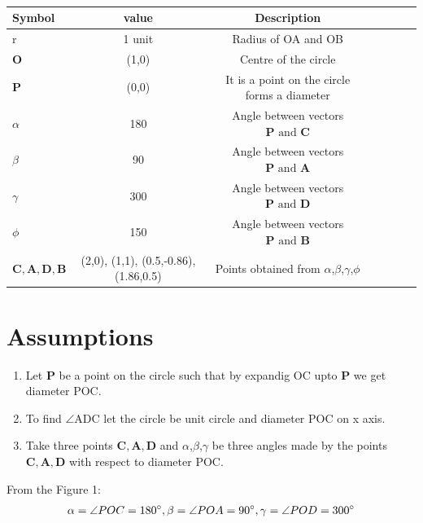 \documentclass[12pt]{article}
\let\vec\mathbf
\begin{document}
\begin{table}[htbp]
 \begin{center}
    \begin{tabular}{|l|c|c|c|c|c|c} \hline \textbf{Symbol}
  & \textbf{value} & \textbf{Description} \\
 \hline
	    r &1 unit& Radius of OA and OB\\ \hline
	    $\vec{O}$ &(1,0) & Centre of the circle\\ \hline
	    $\vec{P}$ &(0,0) & It is a point on the circle forms a diameter\\\hline
	    $\alpha$ & 180\degree&Angle between vectors $\vec{P} \text{ and } \vec{C}$ \\ \hline
	    $\beta$ & 90\degree&Angle between vectors $\vec{P} \text{ and } \vec{A}$ \\ \hline
	    $\gamma$ & 300\degree&Angle between vectors $\vec{P} \text{ and } \vec{D}$ \\ \hline
	    $\phi$ & 150\degree&Angle between vectors $\vec{P} \text{ and } \vec{B}$ \\ \hline

	    $\vec{C},\vec{A},\vec{D},\vec{B}$ &(2,0), (1,1), (0.5,-0.86), (1.86,0.5) & Points obtained from $\alpha$,$\beta$,$\gamma$,$\phi$\\ \hline
\end{tabular}   
\end{center}
\caption{\label{table:dummytable} }
\end{table}

\section*{\large Assumptions}
\begin{enumerate}
	\item Let $\vec{P}$ be a point on the circle such that by expandig OC upto $\vec{P}$ we get diameter POC.
\item To find $\angle$ADC let the circle be unit circle and diameter POC on x axis.
\item Take three points $\vec{C,A,D}$ and $\alpha$,$\beta$,$\gamma$ be three angles made by the points $\vec{C,A,D}$ with respect to diameter POC.
\end{enumerate}
From the Figure 1:
\begin{align}
\alpha = {\angle POC}= 180\degree, 
\beta= {\angle POA} = 90\degree,
\gamma = {\angle POD}=300\degree
\end{align}
\end{document}
